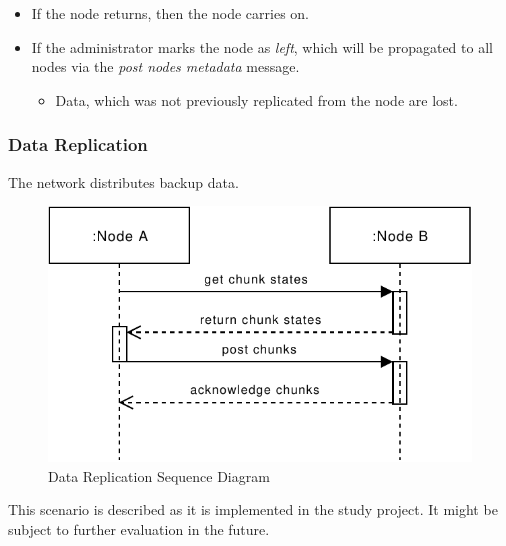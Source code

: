 \begin{itemize}
    \item If the node returns, then the node carries on.
    \item If the administrator marks the node as \emph{left}, which will be propagated to all nodes via the \emph{post nodes metadata} message.
        \begin{itemize}
            \item Data, which was not previously replicated from the node are lost.
        \end{itemize}
\end{itemize}

\subsubsection{Data Replication}\label{sec:scenario-data-replication}
The network distributes backup data.

\begin{figure}[h]
    \centering
    \includegraphics[width=0.6\linewidth]{resources/data_replication.pdf}
    \caption{Data Replication Sequence Diagram}
    \label{fig:data-replication}
\end{figure}

This scenario is described as it is implemented in the study project. It might be subject to further evaluation in the future.


